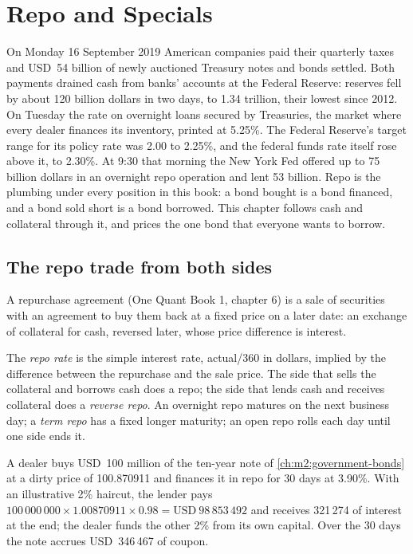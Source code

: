 \chapter{Repo and Specials}\label{ch:m2:repo-and-specials}

On Monday 16 September 2019 American companies paid their quarterly taxes
and USD~54 billion of newly auctioned Treasury notes and bonds settled. Both
payments drained cash from banks' accounts at the Federal Reserve: reserves fell
by about 120 billion dollars in two days, to 1.34 trillion, their lowest since
2012. On Tuesday the rate on overnight loans secured by Treasuries, the market
where every dealer finances its inventory, printed at 5.25\%. The Federal
Reserve's target range for its policy rate was 2.00 to 2.25\%, and the federal
funds rate itself rose above it, to 2.30\%. At 9:30 that morning the New York
Fed offered up to 75 billion dollars in an overnight repo operation and lent
53 billion. Repo is
the plumbing under every position in this book: a bond bought is a bond
financed, and a bond sold short is a bond borrowed. This chapter follows cash
and collateral through it, and prices the one bond that everyone wants to
borrow.

\section{The repo trade from both sides}

A repurchase agreement (One Quant Book 1, chapter 6) is a sale of securities
with an agreement to buy them back at a fixed price on a later date: an
exchange of collateral for cash, reversed later, whose price difference is
interest.

\begin{definition}\label{def:m2:repo-and-specials:rate}
The \emph{repo rate} is the simple interest rate, actual/360
in dollars, implied by the difference between the repurchase and the sale
price. The side that sells the collateral and borrows cash does a repo; the
side that lends cash and receives collateral does a \emph{reverse
repo}. An overnight repo matures on the next business day;
a \emph{term repo} has a fixed longer maturity; an open repo
rolls each day until one side ends it.
\end{definition}

\begin{example}\label{ex:m2:repo-and-specials:finance}
A dealer buys USD~100 million of the ten-year note of
\cref{ch:m2:government-bonds} at a dirty price of 100.870911 and finances it
in repo for 30 days at 3.90\%. With an illustrative 2\% haircut, the lender
pays $100\,000\,000 \times 1.00870911 \times 0.98 = \text{USD}~98\,853\,492$ and
receives 321\,274 of interest at the end; the dealer funds the other 2\% from
its own capital. Over the 30 days the note accrues USD~346\,467 of coupon.
\end{example}

